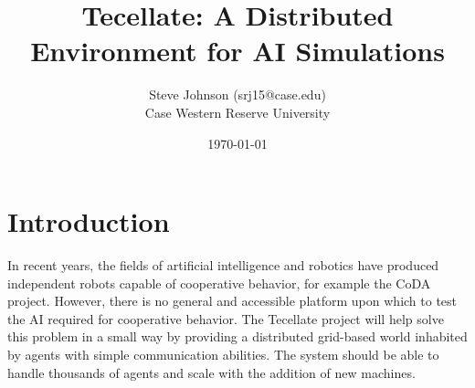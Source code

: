 \documentclass[12pt]{article}
\title{Tecellate: A Distributed Environment for AI Simulations}
\author{
        Steve Johnson (srj15@case.edu)\\
        Case Western Reserve University\\
}
\date{\today}
\begin{document}
\doublespacing
\maketitle


\section{Introduction}

In recent years, the fields of artificial intelligence and robotics have produced independent robots capable of cooperative behavior, for example the CoDA project\cite{CoDA}. However, there is no general and accessible platform upon which to test the AI required for cooperative behavior. The Tecellate project will help solve this problem in a small way by providing a distributed grid-based world inhabited by agents with simple communication abilities. The system should be able to handle thousands of agents and scale with the addition of new machines.









\end{document}
